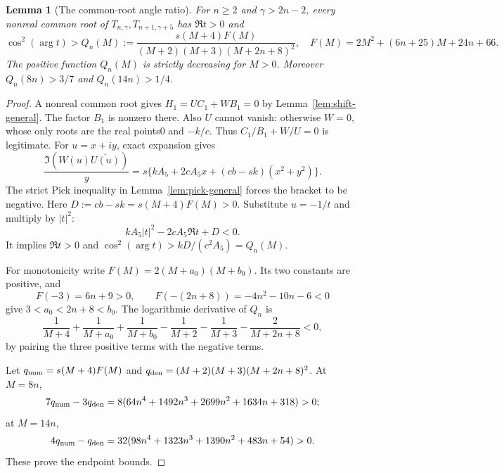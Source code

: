 \documentclass[11pt]{article}
\newtheorem{lemma}{Lemma}
\begin{document}
\begin{lemma}[The common-root angle ratio]\label{lem:angle-ratio}
For $n\ge2$ and $\gamma>2n-2$, every nonreal common root of
$T_{n,\gamma},T_{n+1,\gamma+5}$ has $\Re t>0$ and
\[
 \cos^2(\arg t)>Q_n(M):=
 \frac{s(M+4)F(M)}{(M+2)(M+3)(M+2n+8)^2},\quad
 F(M)=2M^2+(6n+25)M+24n+66.                           \tag{5}
\]
The positive function $Q_n(M)$ is strictly decreasing for $M>0$.
Moreover $Q_n(8n)>3/7$ and $Q_n(14n)>1/4$.
\end{lemma}
\begin{proof}
A nonreal common root gives $H_1=UC_1+WB_1=0$ by
Lemma~\ref{lem:shift-general}.
The factor $B_1$ is nonzero there.
Also $U$ cannot vanish: otherwise $W=0$, whose only roots
are the real points0 and $-k/c$.
Thus $C_1/B_1+W/U=0$ is legitimate.
For $u=x+iy$, exact expansion gives
\[
 \frac{\Im(W(u)\overline{U(u)})}{y}
  =s\{kA_5+2cA_5x+(cb-sk)(x^2+y^2)\}.
\]
The strict Pick inequality in Lemma~\ref{lem:pick-general}
forces the bracket to be negative.
Here
$D:=cb-sk=s(M+4)F(M)>0$.
Substitute $u=-1/t$ and multiply by $|t|^2$:
\[
 kA_5|t|^2-2cA_5\Re t+D<0.
\]
It implies $\Re t>0$ and
$\cos^2(\arg t)>kD/(c^2A_5)=Q_n(M)$.

For monotonicity write $F(M)=2(M+a_0)(M+b_0)$.
Its two constants are positive, and
\[
 F(-3)=6n+9>0,\qquad
 F(-(2n+8))=-4n^2-10n-6<0
\]
give $3<a_0<2n+8<b_0$.
The logarithmic derivative of $Q_n$ is
\[
 \frac1{M+4}+\frac1{M+a_0}+\frac1{M+b_0}
 -\frac1{M+2}-\frac1{M+3}-\frac2{M+2n+8}<0,
\]
by pairing the three positive terms with the negative terms.

Let $q_{\rm num}=s(M+4)F(M)$ and
$q_{\rm den}=(M+2)(M+3)(M+2n+8)^2$.
At $M=8n$,
\[
 7q_{\rm num}-3q_{\rm den}
 =8(64n^4+1492n^3+2699n^2+1634n+318)>0;
\]
at $M=14n$,
\[
 4q_{\rm num}-q_{\rm den}
 =32(98n^4+1323n^3+1390n^2+483n+54)>0.
\]
These prove the endpoint bounds.
\end{proof}
\end{document}
